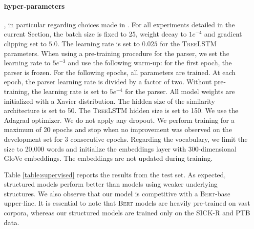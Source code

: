 \paragraph{hyper-parameters} , in particular regarding choices made in \textcite{tai_15}. For all experiments detailed in the current Section, the batch size is fixed to 25, weight decay to $1e^{-4}$ and gradient clipping set to $5.0$. The learning rate is set to $0.025$ for the \textsc{TreeLSTM} parameters. When using a pre-training procedure for the parser, we set the learning rate to $5e^{-3}$ and use the following warm-up: for the first epoch, the parser is frozen. For the following epochs, all parameters are trained. At each epoch, the parser learning rate is divided by a factor of two. Without pre-training, the learning rate is set to $5e^{-4}$ for the parser. All model weights are initialized with a Xavier distribution. The hidden size of the similarity architecture is set to 50. The \textsc{TreeLSTM} hidden size is set to 150. We use the Adagrad optimizer. We do not apply any dropout. We perform training for a maximum of 20 epochs and stop when no improvement was observed on the development set for 3 consecutive epochs.
Regarding the vocabulary, we limit the size to 20,000 words and initialize the embeddings layer with 300-dimensional GloVe embeddings. The embeddings are not updated during training.



Table \ref{table:supervised} reports the results from the test set. As expected, structured models perform better than models using weaker underlying structures. We also observe that our model is competitive with a \textsc{Bert}-base upper-line. It is essential to note that \textsc{Bert} models are heavily pre-trained on vast corpora, whereas our structured models are trained only on the SICK-R and PTB data. 

